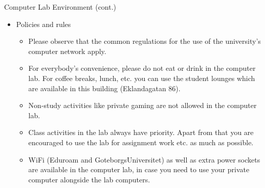 \documentclass[a4,landscape]{seminar}
\begin{document}
\begin{slide}
  {\Large Computer Lab Environment (cont.)}
  \begin{itemize}
  \item Policies and rules
    \begin{itemize}
    \item Please observe that the common regulations for the use of
      the university’s computer network apply.
    \item For everybody's convenience, please do not eat or drink in
      the computer lab. For coffee breaks, lunch, etc. you can use the
      student lounges which are available in this building
      (Eklandagatan 86).
    \item Non-study activities like private gaming are not allowed in
      the computer lab.
    \item Class activities in the lab always have priority. Apart from
      that you are encouraged to use the lab for assignment work etc. as
      much as possible.
    \item WiFi (Eduroam and GoteborgsUniversitet) as well as extra
      power sockets are available in the computer lab, in case you
      need to use your private computer alongside the lab computers.
    \end{itemize}
  \end{itemize}
\end{slide}
\end{document}
